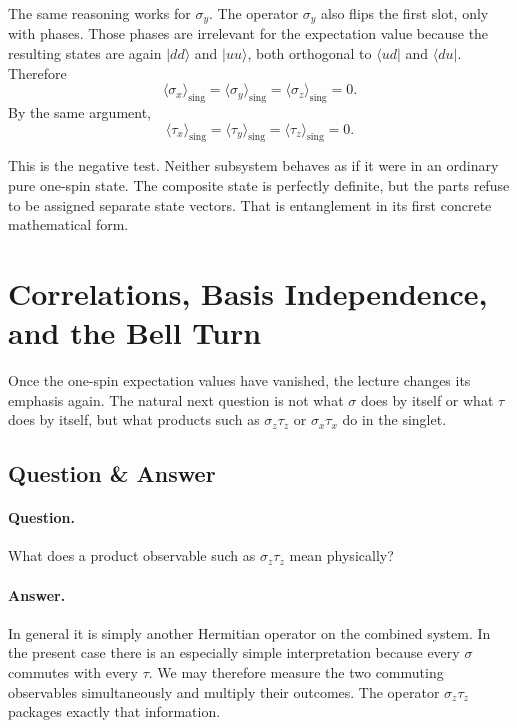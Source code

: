 The same reasoning works for \(\sigma_y\). The operator \(\sigma_y\) also flips the first slot, only with phases. Those phases are irrelevant for the expectation value because the resulting states are again \(|dd\rangle\) and \(|uu\rangle\), both orthogonal to \(\langle ud|\) and \(\langle du|\). Therefore
\begin{equation}
\langle \sigma_x\rangle_{\mathrm{sing}}
=
\langle \sigma_y\rangle_{\mathrm{sing}}
=
\langle \sigma_z\rangle_{\mathrm{sing}}
=0.
\end{equation}
By the same argument,
\begin{equation}
\langle \tau_x\rangle_{\mathrm{sing}}
=
\langle \tau_y\rangle_{\mathrm{sing}}
=
\langle \tau_z\rangle_{\mathrm{sing}}
=0.
\end{equation}

This is the negative test. Neither subsystem behaves as if it were in an ordinary pure one-spin state. The composite state is perfectly definite, but the parts refuse to be assigned separate state vectors. That is entanglement in its first concrete mathematical form.

\section{Correlations, Basis Independence, and the Bell Turn}

Once the one-spin expectation values have vanished, the lecture changes its emphasis again. The natural next question is not what \(\sigma\) does by itself or what \(\tau\) does by itself, but what products such as \(\sigma_z\tau_z\) or \(\sigma_x\tau_x\) do in the singlet.

\subsection{Question \& Answer}

\paragraph{Question.} What does a product observable such as \(\sigma_z\tau_z\) mean physically?

\paragraph{Answer.} In general it is simply another Hermitian operator on the combined system. In the present case there is an especially simple interpretation because every \(\sigma\) commutes with every \(\tau\). We may therefore measure the two commuting observables simultaneously and multiply their outcomes. The operator \(\sigma_z\tau_z\) packages exactly that information.

